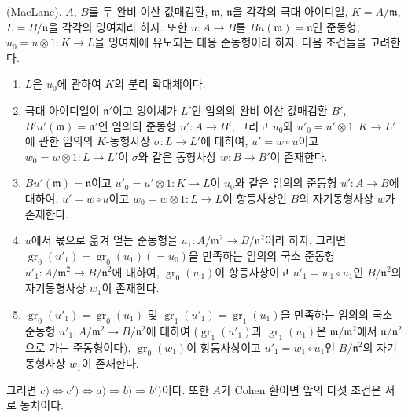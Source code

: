\begin{proposition}[21.5.2]
\label{0.21.5.2-ko}
\textnormal{(MacLane).}
$A$, $B$를 두 완비 이산 값매김환, $\mathfrak m$, $\mathfrak n$을
각각의 극대 아이디얼, $K=A/\mathfrak m$, $L=B/\mathfrak n$을
각각의 잉여체라 하자. 또한 $u:A\to B$를
$Bu(\mathfrak m)=\mathfrak n$인 준동형, $u_0=u\otimes1:K\to L$을
잉여체에 유도되는 대응 준동형이라 하자. 다음 조건들을 고려한다.
\begin{enumerate}
  \item[\rm a)] $L$은 $u_0$에 관하여 $K$의 분리 확대체이다.
  \item[\rm b)] 극대 아이디얼이 $\mathfrak n'$이고 잉여체가 $L'$인
  임의의 완비 이산 값매김환 $B'$,
  $B'u'(\mathfrak m)=\mathfrak n'$인 임의의 준동형 $u':A\to B'$,
  그리고 $u_0$와 $u'_0=u'\otimes1:K\to L'$에 관한 임의의
  $K$-동형사상 $\sigma:L\to L'$에 대하여, $u'=w\circ u$이고
  $w_0=w\otimes1:L\to L'$이 $\sigma$와 같은 동형사상
  $w:B\to B'$이 존재한다.
  \item[\rm b$'$)] $Bu'(\mathfrak m)=\mathfrak n$이고
  $u'_0=u'\otimes1:K\to L$이 $u_0$와 같은 임의의 준동형
  $u':A\to B$에 대하여, $u'=w\circ u$이고
  $w_0=w\otimes1:L\to L$이 항등사상인 $B$의 자기동형사상 $w$가
  존재한다.
  \item[\rm c)] $u$에서 몫으로 옮겨 얻는 준동형을
  $u_1:A/\mathfrak m^2\to B/\mathfrak n^2$이라 하자. 그러면
  $\operatorname{gr}_0(u'_1)=\operatorname{gr}_0(u_1)(=u_0)$을 만족하는
  임의의 국소 준동형
  $u'_1:A/\mathfrak m^2\to B/\mathfrak n^2$에 대하여,
  $\operatorname{gr}_0(w_1)$이 항등사상이고
  $u'_1=w_1\circ u_1$인 $B/\mathfrak n^2$의 자기동형사상 $w_1$이
  존재한다.
  \item[\rm c$'$)]
  $\operatorname{gr}_0(u'_1)=\operatorname{gr}_0(u_1)$ 및
  $\operatorname{gr}_1(u'_1)=\operatorname{gr}_1(u_1)$을 만족하는
  임의의 국소 준동형
  $u'_1:A/\mathfrak m^2\to B/\mathfrak n^2$에 대하여
  ($\operatorname{gr}_1(u'_1)$과 $\operatorname{gr}_1(u_1)$은
  $\mathfrak m/\mathfrak m^2$에서 $\mathfrak n/\mathfrak n^2$으로 가는
  준동형이다), $\operatorname{gr}_0(w_1)$이 항등사상이고
  $u'_1=w_1\circ u_1$인 $B/\mathfrak n^2$의 자기동형사상 $w_1$이
  존재한다.
\end{enumerate}
그러면 $c)\Leftrightarrow c')\Leftrightarrow a)\Rightarrow b)
\Rightarrow b')$이다. 또한 $A$가 Cohen 환이면 앞의 다섯 조건은
서로 동치이다.

\end{proposition}

